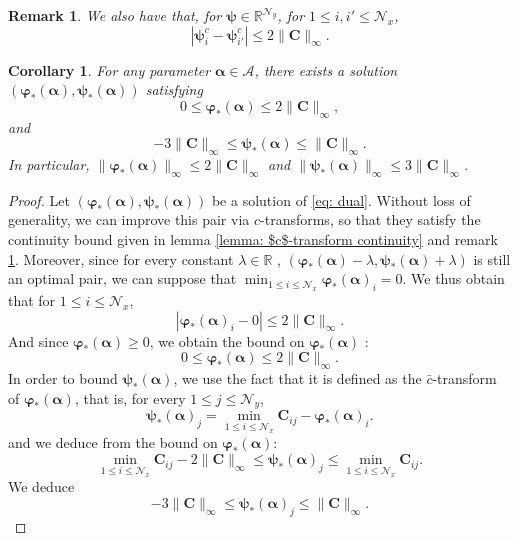 \documentclass{article}
\def\RR{\mathbb{R}}
\def\cA{\mathcal{A}}
\def\cN{\mathcal{N}}
\def\aalpha{\boldsymbol{\alpha}}
\def\pphi{\boldsymbol{\varphi}}
\def\ppsi{\boldsymbol{\psi}}
\def\CC{\mathbf{C}}
\newtheorem{cor}[thm]{Corollary}
\newtheorem{rmk}[thm]{Remark}
\begin{document}
%
\begin{rmk} \label{rmk : bar $c$-transform continuity}
    We also have that, for $ \ppsi \in \RR^{\cN_y} $, for $1 \leq i, i' \leq \cN_x$,
    \begin{equation}
        | \ppsi^c_i - \ppsi^c_{i'} | \leq 2 \| \CC \|_\infty.
    \end{equation}
\end{rmk}
%
\begin{cor} \label{cor: bound on potential}
    For any parameter $\aalpha \in \cA$, there exists a solution $(\pphi_*(\aalpha), \ppsi_*(\aalpha))$ satisfying
    \begin{equation}
        0\leq \pphi_*(\aalpha) \leq 2 \| \CC\|_\infty, 
    \end{equation}
    and
    \begin{equation}
        - 3\| \CC \|_\infty \leq \ppsi_*(\aalpha) \leq  \| \CC \|_\infty.
    \end{equation}
    In particular, $\|\pphi_*(\aalpha)\|_\infty \leq 2\| \CC\|_\infty$ and $\|\ppsi_*(\aalpha)\|_\infty \leq 3\| \CC\|_\infty$.
\end{cor}
%
\begin{proof}
    Let $(\pphi_*(\aalpha), \ppsi_*(\aalpha))$ be a solution of \eqref{eq: dual}. Without loss of generality, we can improve this pair via $c$-transforms, so that they satisfy the continuity bound given in lemma \ref{lemma: $c$-transform continuity} and remark \ref{rmk : bar $c$-transform continuity}. Moreover, since for every constant $\lambda \in \RR$ , $(\pphi_*(\aalpha) - \lambda, \ppsi_*(\aalpha) + \lambda)$ is still an optimal pair, we can suppose that  $\displaystyle  \min_{1\leq i \leq \cN_x} \pphi_*(\aalpha)_i = 0$. We thus obtain that for $1 \leq i \leq \cN_x $, 
    \begin{equation}
        |\pphi_*(\aalpha)_i - 0|\leq 2 \| \CC \|_\infty.
    \end{equation}
    And since $\pphi_*(\aalpha) \geq 0$, we obtain the bound on $\pphi_*(\aalpha)$ :
    \begin{equation*}
        0 \leq \pphi_*(\aalpha) \leq 2 \| \CC \|_\infty.
    \end{equation*}
    In order to bound $\ppsi_*(\aalpha)$, we use the fact that it is defined as the $\bar c$-transform of $\pphi_*(\aalpha)$, that is, for every $1 \leq j \leq \cN_y$, 
    \begin{equation*}
        \ppsi_*(\aalpha)_j = \min_{1\leq i \leq \cN_x} \CC_{ij} - \pphi_*(\aalpha)_i.
    \end{equation*}
   and we deduce from the bound on $\pphi_*(\aalpha)$:
   \begin{equation*}
       \min_{1\leq i \leq \cN_x} \CC_{ij} - 2 \| \CC \|_\infty \leq \ppsi_*(\aalpha)_j \leq \min_{1\leq i \leq \cN_x} \CC_{ij}.
   \end{equation*}
    We deduce
    \begin{equation*}
        - 3 \| \CC \|_\infty \leq \ppsi_*(\aalpha)_j \leq \| \CC \|_\infty.
   \end{equation*}
\end{proof}
\end{document}
